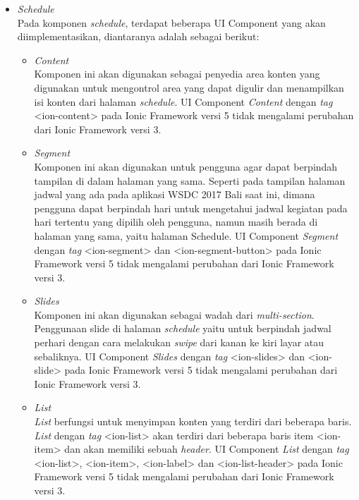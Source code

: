 \begin{itemize}
	\item \textit{Schedule} \\
	Pada komponen \textit{schedule}, terdapat beberapa UI Component yang akan diimplementasikan, diantaranya adalah sebagai berikut:
		\begin{itemize}
			\item \textit{Content} \\
		Komponen ini akan digunakan sebagai penyedia area konten yang digunakan untuk mengontrol area yang dapat digulir dan menampilkan isi konten dari halaman \textit{schedule}. UI Component \textit{Content} dengan \textit{tag} <ion-content> pada Ionic Framework versi 5 tidak mengalami perubahan dari Ionic Framework versi 3.
			\item \textit{Segment} \\
		Komponen ini akan digunakan untuk pengguna agar dapat berpindah tampilan di dalam halaman yang sama. Seperti pada tampilan halaman jadwal yang ada pada aplikasi WSDC 2017 Bali saat ini, dimana pengguna dapat berpindah hari untuk mengetahui jadwal kegiatan pada hari tertentu yang dipilih oleh pengguna, namun masih berada di halaman yang sama, yaitu halaman Schedule. UI Component \textit{Segment} dengan \textit{tag} <ion-segment> dan <ion-segment-button> pada Ionic Framework versi 5 tidak mengalami perubahan dari Ionic Framework versi 3.
			\item \textit{Slides} \\
		Komponen ini akan digunakan sebagai wadah dari \textit{multi-section}. Penggunaan slide di halaman \textit{schedule} yaitu untuk berpindah jadwal perhari dengan cara melakukan \textit{swipe} dari kanan ke kiri layar atau sebaliknya. UI Component \textit{Slides} dengan \textit{tag} <ion-slides> dan <ion-slide> pada Ionic Framework versi 5 tidak mengalami perubahan dari Ionic Framework versi 3.
			\item \textit{List} \\
			\textit{List} berfungsi untuk menyimpan konten yang terdiri dari beberapa baris. \textit{List} dengan \textit{tag} <ion-list> akan terdiri dari beberapa baris item <ion-item> dan akan memiliki sebuah \textit{header}. UI Component \textit{List} dengan \textit{tag} <ion-list>, <ion-item>, <ion-label> dan <ion-list-header> pada Ionic Framework versi 5 tidak mengalami perubahan dari Ionic Framework versi 3.
		\end{itemize}
		

\end{itemize}
